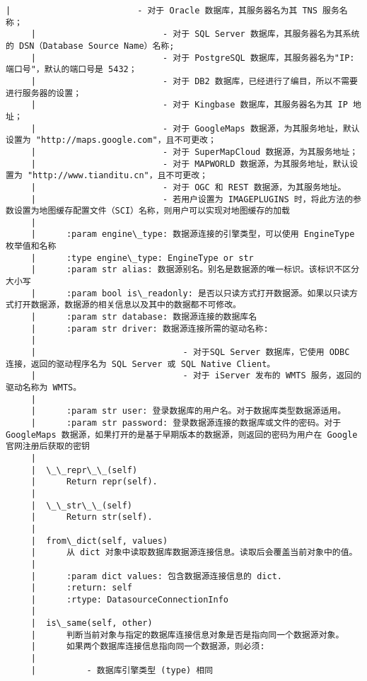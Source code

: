 \documentclass[11pt]{article}
\begin{document}
\begin{Verbatim}[commandchars=\\\{\}]
     |                         - 对于 Oracle 数据库，其服务器名为其 TNS 服务名称；
     |                         - 对于 SQL Server 数据库，其服务器名为其系统的 DSN（Database Source Name）名称;
     |                         - 对于 PostgreSQL 数据库，其服务器名为"IP:端口号"，默认的端口号是 5432；
     |                         - 对于 DB2 数据库，已经进行了编目，所以不需要进行服务器的设置；
     |                         - 对于 Kingbase 数据库，其服务器名为其 IP 地址；
     |                         - 对于 GoogleMaps 数据源，为其服务地址，默认设置为 "http://maps.google.com"，且不可更改；
     |                         - 对于 SuperMapCloud 数据源，为其服务地址；
     |                         - 对于 MAPWORLD 数据源，为其服务地址，默认设置为 "http://www.tianditu.cn"，且不可更改；
     |                         - 对于 OGC 和 REST 数据源，为其服务地址。
     |                         - 若用户设置为 IMAGEPLUGINS 时，将此方法的参数设置为地图缓存配置文件（SCI）名称，则用户可以实现对地图缓存的加载
     |      
     |      :param engine\_type: 数据源连接的引擎类型，可以使用 EngineType 枚举值和名称
     |      :type engine\_type: EngineType or str
     |      :param str alias: 数据源别名。别名是数据源的唯一标识。该标识不区分大小写
     |      :param bool is\_readonly: 是否以只读方式打开数据源。如果以只读方式打开数据源，数据源的相关信息以及其中的数据都不可修改。
     |      :param str database: 数据源连接的数据库名
     |      :param str driver: 数据源连接所需的驱动名称:
     |      
     |                             - 对于SQL Server 数据库，它使用 ODBC 连接，返回的驱动程序名为 SQL Server 或 SQL Native Client。
     |                             - 对于 iServer 发布的 WMTS 服务，返回的驱动名称为 WMTS。
     |      
     |      :param str user: 登录数据库的用户名。对于数据库类型数据源适用。
     |      :param str password: 登录数据源连接的数据库或文件的密码。对于 GoogleMaps 数据源，如果打开的是基于早期版本的数据源，则返回的密码为用户在 Google 官网注册后获取的密钥
     |  
     |  \_\_repr\_\_(self)
     |      Return repr(self).
     |  
     |  \_\_str\_\_(self)
     |      Return str(self).
     |  
     |  from\_dict(self, values)
     |      从 dict 对象中读取数据库数据源连接信息。读取后会覆盖当前对象中的值。
     |      
     |      :param dict values: 包含数据源连接信息的 dict.
     |      :return: self
     |      :rtype: DatasourceConnectionInfo
     |  
     |  is\_same(self, other)
     |      判断当前对象与指定的数据库连接信息对象是否是指向同一个数据源对象。
     |      如果两个数据库连接信息指向同一个数据源，则必须:
     |      
     |          - 数据库引擎类型 (type) 相同

\end{Verbatim}
\end{document}
